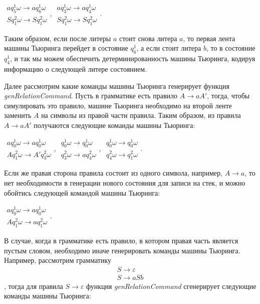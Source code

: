 \documentclass[14pt]{matmex-diploma-custom}
\begin{document}
$\begin{array}{lcl}
    a q_5^1 \omega \to a q_6^1 \omega \\
    S q_1^2 \omega \to S q_1^2 \omega 
\end{array}$,
$\begin{array}{lcl}
    a q_3^1 \omega \to a q_4^1 \omega \\
    S q_1^2 \omega \to S q_1^2 \omega 
\end{array}$.

Таким образом, если после литеры $a$ стоит снова литера $a$, то первая лента машины Тьюринга перейдет в состояние $q_6^1$, а если стоит литера $b$, то в состояние $q_4^1$, и так мы можем обеспечить детерминированность машины Тьюринга, кодируя информацию о следующей литере состоянием. 

Далее рассмотрим какие команды машины Тьюринга генерирует функция \textit{genRelationCommand}.
Пусть в грамматике есть правило $A \to a A'$, тогда, чтобы симулировать это правило, машине Тьюринга
необходимо на второй ленте заменить $A$ на символы из правой части правила. Таким образом, из правила $A \to a A'$ получаются 
следующие команды машины Тьюринга: 

$\begin{array}{lcl}
    a q_0^1 \omega \to a q_0^1 \omega \\
    A q_1^2 \omega \to A' q_3^2 \omega 
\end{array}$,
$\begin{array}{lcl}
    q_0^1 \omega \to q_0^1 \omega \\
    q_3^2 \omega \to a q_4^2 \omega 
\end{array}$,
$\begin{array}{lcl}
    q_0^1 \omega \to q_0^1 \omega \\
    q_4^2 \omega \to q_1^2 \omega 
\end{array}$. 

Если же правая сторона правила состоит из одного символа, например, $A \to a$, то нет необходимости в генерации нового состояния для записи на стек, и можно обойтись следующей командой машины Тьюринга: 

$\begin{array}{lcl}
    a q_0^1 \omega \to a q_0^1 \omega \\
    A q_1^2 \omega \to a q_1^2 \omega 
\end{array}$. 

В случае, когда в грамматике есть правило, в котором правая часть является пустым словом, необходимо иначе генерировать команды машины Тьюринга. Например, рассмотрим грамматику 
$$\begin{array}{lcl}
    S \to \varepsilon \\
    S \to a S b
\end{array}$$
, тогда для правила $S \to \varepsilon$ функция \textit{genRelationCommand} сгенерирует следующие команды машины Тьюринга:
\end{document}

